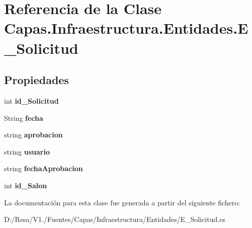 \section{Referencia de la Clase Capas.\+Infraestructura.\+Entidades.\+E\+\_\+\+Solicitud}
\label{class_capas_1_1_infraestructura_1_1_entidades_1_1_e___solicitud}
\subsection*{Propiedades}
\begin{DoxyCompactItemize}
\item 
int {\bfseries id\+\_\+\+Solicitud}\hspace{0.3cm}{\ttfamily  [get, set]}\label{class_capas_1_1_infraestructura_1_1_entidades_1_1_e___solicitud_a27e8c31ab75c72980ffcf4a8a95a6295}

\item 
String {\bfseries fecha}\hspace{0.3cm}{\ttfamily  [get, set]}\label{class_capas_1_1_infraestructura_1_1_entidades_1_1_e___solicitud_a13a683d898a1a9a39826f92ff67ea33a}

\item 
string {\bfseries aprobacion}\hspace{0.3cm}{\ttfamily  [get, set]}\label{class_capas_1_1_infraestructura_1_1_entidades_1_1_e___solicitud_a1eff0fc056ec89a3623c8810c44692c6}

\item 
string {\bfseries usuario}\hspace{0.3cm}{\ttfamily  [get, set]}\label{class_capas_1_1_infraestructura_1_1_entidades_1_1_e___solicitud_a0152784146ba9dde63d10e9e7756785d}

\item 
string {\bfseries fecha\+Aprobacion}\hspace{0.3cm}{\ttfamily  [get, set]}\label{class_capas_1_1_infraestructura_1_1_entidades_1_1_e___solicitud_a2507af9e39f9b8927f3f5f2ea668442b}

\item 
int {\bfseries id\+\_\+\+Salon}\hspace{0.3cm}{\ttfamily  [get, set]}\label{class_capas_1_1_infraestructura_1_1_entidades_1_1_e___solicitud_ae532e42034c967971624a1ff1fc250e7}

\end{DoxyCompactItemize}


La documentación para esta clase fue generada a partir del siguiente fichero\+:\begin{DoxyCompactItemize}
\item 
D\+:/\+Resa/\+V1./\+Fuentes/\+Capas/\+Infraestructura/\+Entidades/E\+\_\+\+Solicitud.\+cs\end{DoxyCompactItemize}
